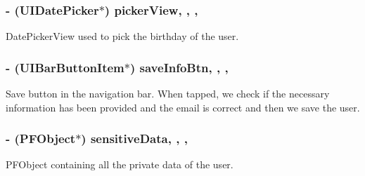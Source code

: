 \subsubsection[{picker\+View}]{\setlength{\rightskip}{0pt plus 5cm}-\/ (U\+I\+Date\+Picker$\ast$) picker\+View\hspace{0.3cm}{\ttfamily [read]}, {\ttfamily [write]}, {\ttfamily [nonatomic]}, {\ttfamily [strong]}}\label{interface_e_s_edit_profile_view_controller_a6a86d1bff921b0bf6629907cada17808}
Date\+Picker\+View used to pick the birthday of the user. \hypertarget{interface_e_s_edit_profile_view_controller_a997b75bc61f0cf058852c2fcc676182b}{}
\subsubsection[{save\+Info\+Btn}]{\setlength{\rightskip}{0pt plus 5cm}-\/ (U\+I\+Bar\+Button\+Item$\ast$) save\+Info\+Btn\hspace{0.3cm}{\ttfamily [read]}, {\ttfamily [write]}, {\ttfamily [nonatomic]}, {\ttfamily [strong]}}\label{interface_e_s_edit_profile_view_controller_a997b75bc61f0cf058852c2fcc676182b}
Save button in the navigation bar. When tapped, we check if the necessary information has been provided and the email is correct and then we save the user. \hypertarget{interface_e_s_edit_profile_view_controller_a53c8bf2dc1137d68e9c7737363bc29f5}{}
\subsubsection[{sensitive\+Data}]{\setlength{\rightskip}{0pt plus 5cm}-\/ (P\+F\+Object$\ast$) sensitive\+Data\hspace{0.3cm}{\ttfamily [read]}, {\ttfamily [write]}, {\ttfamily [nonatomic]}, {\ttfamily [strong]}}\label{interface_e_s_edit_profile_view_controller_a53c8bf2dc1137d68e9c7737363bc29f5}
P\+F\+Object containing all the private data of the user. \hypertarget{interface_e_s_edit_profile_view_controller_a931a49c00563f36df4c0eef6331cad48}{}

